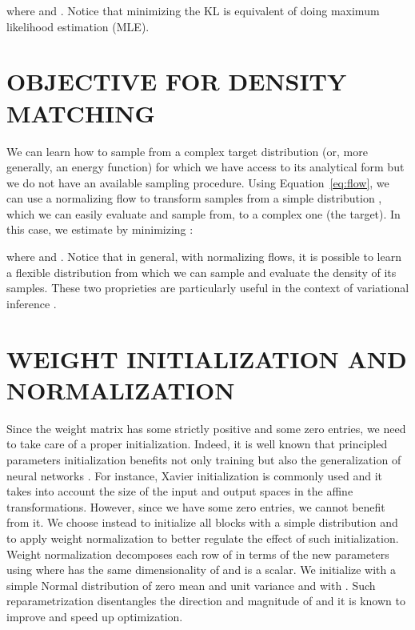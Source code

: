\documentclass[letterpaper]{article}
\begin{document}
where  and . Notice that minimizing the KL is equivalent of doing maximum likelihood estimation (MLE).

\section{OBJECTIVE FOR DENSITY MATCHING} \label{app:kl_energy_function}
We can learn how to sample from a complex target distribution  (or, more generally, an energy function) for which we have access to its analytical form but we do not have an available sampling procedure. Using Equation~\ref{eq:flow}, we can use a normalizing flow to transform samples from a simple distribution , which we can easily evaluate and sample from, to a complex one (the target). In this case, we estimate  by minimizing :

where  and .
Notice that in general, with normalizing flows, it is possible to learn a flexible distribution from which we can sample and evaluate the density of its samples. These two proprieties are particularly useful in the context of variational inference \citep{rezende2015variational}. 

\section{WEIGHT INITIALIZATION AND NORMALIZATION} \label{app:weight}
Since the weight matrix  has some strictly positive and some zero entries, we need to take care of a proper initialization. Indeed, it is well known that principled parameters initialization benefits not only training but also the generalization of neural networks \citep{glorot2010understanding}. For instance, Xavier initialization is commonly used and it takes into account the size of the input and output spaces in the affine transformations. However, since we have some zero entries, we cannot benefit from it. We choose instead to initialize all blocks with a simple distribution and to apply weight normalization \citep{salimans2016weight} to better regulate the effect of such initialization. Weight normalization decomposes each row  of  in terms of the new parameters using  where  has the same dimensionality of  and  is a scalar. We initialize  with a simple Normal distribution of zero mean and unit variance and  with . Such reparametrization disentangles the direction and magnitude of  and it is known to improve and speed up optimization.

\hfill
\clearpage
\end{document}
